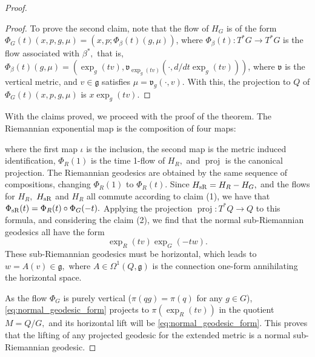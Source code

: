 \documentclass[12pt, letterpaper, reqno]{amsart}
\theoremstyle{definition}
\theoremstyle{plain}
\theoremstyle{remark}
\begin{document}
\begin{proof}
\begin{proof}
		To prove the second claim, note that the flow of $ H_G $ is of the form $\Phi_G(t)(x,p,g,\mu)= (x,p; \Phi_\beta(t)(g,\mu))$, where $ \Phi_\beta(t): T^*G \rightarrow T^*G$ is the flow associated with $ \beta^*, $ that is, $ \Phi_\beta(t)(g,\mu)=( \operatorname{exp}_g(tv), \mathfrak{v}_{ \operatorname{exp}_g(tv) }(\cdot, d/dt \operatorname{exp}_g(tv) ) ) $, where $ \mathfrak{v} $ is the vertical metric, and $ v \in \mathfrak{g} $ satisfies $ \mu = \mathfrak{v}_g(\cdot,v). $ With this, the projection to $ Q $ of $ \Phi_G(t)(x,p,g,\mu) $ is $ x \operatorname{exp}_g(tv). $  
	\end{proof}
	With the claims proved, we proceed with the proof of the theorem. The Riemannian exponential map is the composition of four maps:
	\begin{center}
	\end{center}
	where the first map $ \iota $ is the inclusion, the second map is the metric induced identification, $ \Phi_R(1) $ is the time 1-flow of $ H_R, $ and $ \operatorname{proj}  $ is the canonical projection. The Riemannian geodesics are obtained by the same sequence of compositions, changing $ \Phi_R(1) $ to $ \Phi_R(t). $ Since $ H_{\rm sR} = H_R - H_G, $ and the flows for $ H_R, $ $ H_{\rm sR} $ and $ H_R $ all commute according to claim (1), we have that $ \Phi_{\rm sR}(t)= \Phi_R(t)\circ \Phi_G(-t). $  Applying the projection $ \operatorname{proj} :T^*Q \rightarrow Q $ to this formula, and considering the claim (2), we find that the normal sub-Riemannian geodesics all have the form 
	\begin{equation}\label{eq:normal_geodesic_form}
		\operatorname{exp}_R(tv)  \operatorname{exp}_G(-tw).
	\end{equation}
	These sub-Riemannian geodesics must be horizontal, which leads to $ w=A(v)\in \mathfrak{g}, $ where $A\in \Omega^1(Q, \mathfrak{g})$ is the connection one-form annihilating the horizontal space.

	As the flow $ \Phi_G $ is purely vertical ($\pi(qg)=\pi(q)$ for any $ g\in G $), \eqref{eq:normal_geodesic_form} projects to $ \pi( \operatorname{exp}_R(tv)) $ in the quotient $ M=Q/G, $ and its horizontal lift will be \eqref{eq:normal_geodesic_form}. This proves that the lifting of any projected geodesic for the extended metric is a normal sub-Riemannian geodesic.


\end{proof}
\end{document}
